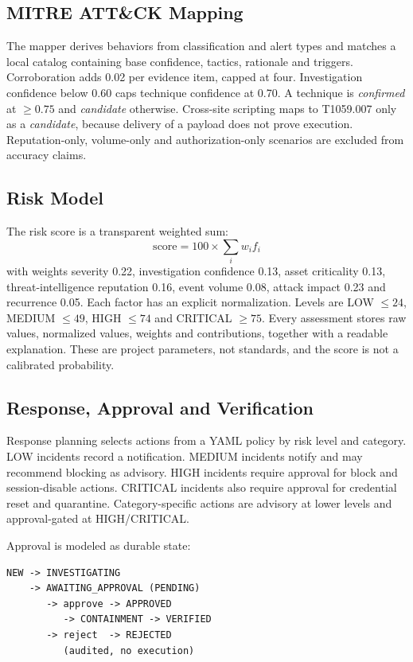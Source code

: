 \documentclass[10pt,twocolumn]{article}
\begin{document}
\subsection{MITRE ATT\&CK Mapping}

The mapper derives behaviors from classification and alert types and matches a local catalog containing base confidence, tactics, rationale and triggers. Corroboration adds 0.02 per evidence item, capped at four. Investigation confidence below 0.60 caps technique confidence at 0.70. A technique is \emph{confirmed} at $\geq 0.75$ and \emph{candidate} otherwise. Cross-site scripting maps to T1059.007 only as a \emph{candidate}, because delivery of a payload does not prove execution. Reputation-only, volume-only and authorization-only scenarios are excluded from accuracy claims.

\subsection{Risk Model}

The risk score is a transparent weighted sum:
\begin{equation}
\text{score} = 100 \times \sum_i w_i f_i
\end{equation}
with weights severity 0.22, investigation confidence 0.13, asset criticality 0.13, threat-intelligence reputation 0.16, event volume 0.08, attack impact 0.23 and recurrence 0.05. Each factor has an explicit normalization. Levels are LOW $\leq 24$, MEDIUM $\leq 49$, HIGH $\leq 74$ and CRITICAL $\geq 75$. Every assessment stores raw values, normalized values, weights and contributions, together with a readable explanation. These are project parameters, not standards, and the score is not a calibrated probability.

\subsection{Response, Approval and Verification}

Response planning selects actions from a YAML policy by risk level and category. LOW incidents record a notification. MEDIUM incidents notify and may recommend blocking as advisory. HIGH incidents require approval for block and session-disable actions. CRITICAL incidents also require approval for credential reset and quarantine. Category-specific actions are advisory at lower levels and approval-gated at HIGH/CRITICAL.

Approval is modeled as durable state:
\begin{small}
\begin{verbatim}
NEW -> INVESTIGATING
    -> AWAITING_APPROVAL (PENDING)
       -> approve -> APPROVED
          -> CONTAINMENT -> VERIFIED
       -> reject  -> REJECTED
          (audited, no execution)
\end{verbatim}
\end{small}
\end{document}
